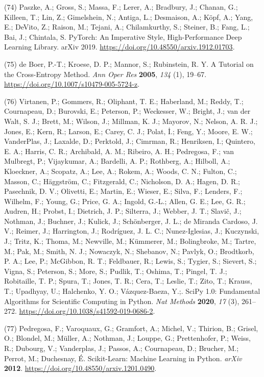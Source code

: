 \documentclass[ lineno,
  9pt]{elife}
\newenvironment{cslreferences}%
  {}%
  {\par}
\begin{document}
\begin{cslreferences}
\leavevmode\hypertarget{ref-iOWq2JB8}{}%
(74) Paszke, A.; Gross, S.; Massa, F.; Lerer, A.; Bradbury, J.; Chanan, G.; Killeen, T.; Lin, Z.; Gimelshein, N.; Antiga, L.; Desmaison, A.; Köpf, A.; Yang, E.; DeVito, Z.; Raison, M.; Tejani, A.; Chilamkurthy, S.; Steiner, B.; Fang, L.; Bai, J.; Chintala, S. PyTorch: An Imperative Style, High-Performance Deep Learning Library. arXiv 2019. \url{https://doi.org/10.48550/arxiv.1912.01703}.

\leavevmode\hypertarget{ref-hchMCnC1}{}%
(75) de Boer, P.-T.; Kroese, D. P.; Mannor, S.; Rubinstein, R. Y. A Tutorial on the Cross-Entropy Method. \emph{Ann Oper Res} \textbf{2005}, \emph{134} (1), 19--67. \url{https://doi.org/10.1007/s10479-005-5724-z}.

\leavevmode\hypertarget{ref-8Miti2Gz}{}%
(76) Virtanen, P.; Gommers, R.; Oliphant, T. E.; Haberland, M.; Reddy, T.; Cournapeau, D.; Burovski, E.; Peterson, P.; Weckesser, W.; Bright, J.; van der Walt, S. J.; Brett, M.; Wilson, J.; Millman, K. J.; Mayorov, N.; Nelson, A. R. J.; Jones, E.; Kern, R.; Larson, E.; Carey, C. J.; Polat, İ.; Feng, Y.; Moore, E. W.; VanderPlas, J.; Laxalde, D.; Perktold, J.; Cimrman, R.; Henriksen, I.; Quintero, E. A.; Harris, C. R.; Archibald, A. M.; Ribeiro, A. H.; Pedregosa, F.; van Mulbregt, P.; Vijaykumar, A.; Bardelli, A. P.; Rothberg, A.; Hilboll, A.; Kloeckner, A.; Scopatz, A.; Lee, A.; Rokem, A.; Woods, C. N.; Fulton, C.; Masson, C.; Häggström, C.; Fitzgerald, C.; Nicholson, D. A.; Hagen, D. R.; Pasechnik, D. V.; Olivetti, E.; Martin, E.; Wieser, E.; Silva, F.; Lenders, F.; Wilhelm, F.; Young, G.; Price, G. A.; Ingold, G.-L.; Allen, G. E.; Lee, G. R.; Audren, H.; Probst, I.; Dietrich, J. P.; Silterra, J.; Webber, J. T.; Slavič, J.; Nothman, J.; Buchner, J.; Kulick, J.; Schönberger, J. L.; de Miranda Cardoso, J. V.; Reimer, J.; Harrington, J.; Rodríguez, J. L. C.; Nunez-Iglesias, J.; Kuczynski, J.; Tritz, K.; Thoma, M.; Newville, M.; Kümmerer, M.; Bolingbroke, M.; Tartre, M.; Pak, M.; Smith, N. J.; Nowaczyk, N.; Shebanov, N.; Pavlyk, O.; Brodtkorb, P. A.; Lee, P.; McGibbon, R. T.; Feldbauer, R.; Lewis, S.; Tygier, S.; Sievert, S.; Vigna, S.; Peterson, S.; More, S.; Pudlik, T.; Oshima, T.; Pingel, T. J.; Robitaille, T. P.; Spura, T.; Jones, T. R.; Cera, T.; Leslie, T.; Zito, T.; Krauss, T.; Upadhyay, U.; Halchenko, Y. O.; Vázquez-Baeza, Y.;. SciPy 1.0: Fundamental Algorithms for Scientific Computing in Python. \emph{Nat Methods} \textbf{2020}, \emph{17} (3), 261--272. \url{https://doi.org/10.1038/s41592-019-0686-2}.

\leavevmode\hypertarget{ref-AujvwLp6}{}%
(77) Pedregosa, F.; Varoquaux, G.; Gramfort, A.; Michel, V.; Thirion, B.; Grisel, O.; Blondel, M.; Müller, A.; Nothman, J.; Louppe, G.; Prettenhofer, P.; Weiss, R.; Dubourg, V.; Vanderplas, J.; Passos, A.; Cournapeau, D.; Brucher, M.; Perrot, M.; Duchesnay, É. Scikit-Learn: Machine Learning in Python. \emph{arXiv} \textbf{2012}. \url{https://doi.org/10.48550/arxiv.1201.0490}.


\end{cslreferences}
\end{document}
